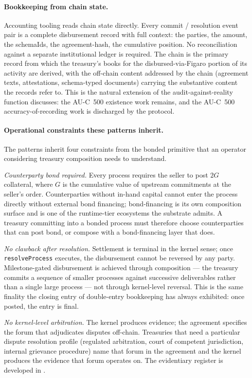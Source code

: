 \documentclass[11pt,a4paper]{article}
\theoremstyle{definition}
\theoremstyle{remark}
\begin{document}
\paragraph{Bookkeeping from chain state.}
Accounting tooling reads chain state directly. Every commit /
resolution event pair is a complete disbursement record with
full context: the parties, the amount, the schemaIds, the
agreement-hash, the cumulative position. No reconciliation
against a separate institutional ledger is required. The chain
is the primary record from which the treasury's books for the
disbursed-via-Figaro portion of its activity are derived, with
the off-chain content addressed by the chain (agreement texts,
attestations, schema-typed documents) carrying the substantive
content the records refer to. This is the natural extension of
the audit-against-reality function 
discusses: the AU-C~500 existence work remains, and the AU-C~500
accuracy-of-recording work is discharged by the protocol.

\paragraph{Operational constraints these patterns inherit.}
The patterns inherit four constraints from the bonded primitive
that an operator considering treasury composition needs to
understand.

\emph{Counterparty bond required.} Every process requires the
seller to post $2G$ collateral, where $G$ is the cumulative
value of upstream commitments at the seller's order. Counterparties
without in-hand capital cannot enter the process directly without
external bond financing; bond-financing is its own composition
surface and is one of the runtime-tier ecosystems the substrate
admits. A treasury committing into a bonded process must
therefore choose counterparties that can post bond, or compose
with a bond-financing layer that does.

\emph{No clawback after resolution.} Settlement is terminal in
the kernel sense; once \texttt{resolveProcess} executes, the
disbursement cannot be reversed by any party. Milestone-gated
disbursement is achieved through composition --- the treasury
commits a sequence of smaller processes against successive
deliverables rather than a single large process --- not
through kernel-level reversal. This is the same finality the
closing entry of double-entry bookkeeping has always
exhibited: once posted, the entry is final.

\emph{No kernel-level arbitration.} The kernel produces
evidence; the agreement specifies the forum that adjudicates
disputes off-chain. Treasuries that need a particular dispute
resolution profile (regulated arbitration, court of competent
jurisdiction, internal grievance procedure) name that forum in
the agreement and the kernel produces the evidence that forum
operates on. The evidentiary register is developed in
.
\end{document}
